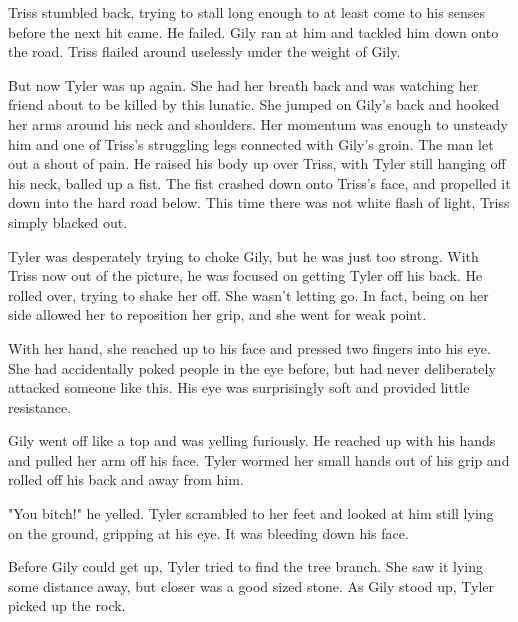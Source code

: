 \documentclass[courier]{sffms}
\begin{document}
Triss stumbled back, trying to stall long enough to
at least come to his senses before the next hit came.
He failed. Gily ran at him and tackled him down onto
the road. Triss flailed around uselessly under the
weight of Gily.

But now Tyler was up again. She had her breath
back and was watching her friend about to be
killed by this lunatic. She jumped on Gily's back
and hooked her arms around his neck and
shoulders. Her momentum was enough to
unsteady him and one of Triss's struggling legs
connected with Gily's groin. The man let out a shout
of pain. He raised his body up over Triss, with Tyler
still hanging off his neck, balled up a fist. The fist
crashed down onto Triss's face, and propelled it
down into the hard road below. This time there
was not white flash of light, Triss simply blacked out.

Tyler was desperately trying to choke Gily, but he was
just too strong. With Triss now out of the picture,
he was focused on getting Tyler off his back. He rolled
over, trying to shake her off. She wasn't letting go. In
fact, being on her side allowed her to reposition her
grip, and she went for weak point.

With her hand, she reached up to his face and pressed
two fingers into his eye. She had accidentally poked
people in the eye before, but had never deliberately
attacked someone like this. His eye was surprisingly
soft and provided little resistance.

Gily went off like a top and was yelling furiously.
He reached up with his hands and pulled her arm
off his face. Tyler wormed her small hands out of his
grip and rolled off his back and away from him.

"You bitch!" he yelled. Tyler scrambled to her feet and
looked at him still lying on the ground, gripping at his
eye. It was bleeding down his face.

Before Gily could get up, Tyler tried to find the tree
branch. She saw it lying some distance away, but closer
was a good sized stone. As Gily stood up, Tyler picked
up the rock.
\end{document}
